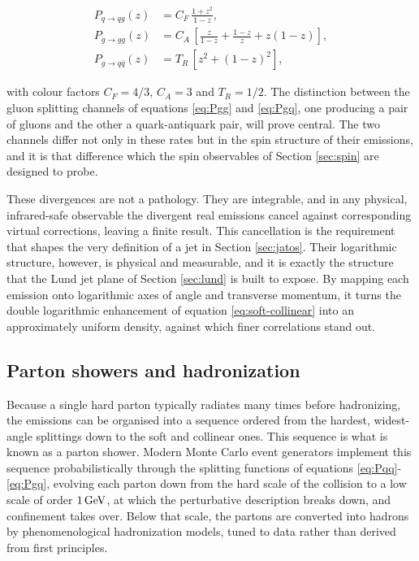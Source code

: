 \begin{align}
  P_{q \to qg}(z) &= C_F\,\frac{1 + z^2}{1 - z}, \label{eq:Pqq}\\[4pt]
  P_{g \to gg}(z) &= C_A\,
    \left[ \frac{z}{1-z} + \frac{1-z}{z} + z(1-z) \right], \label{eq:Pgg}\\[4pt]
  P_{g \to q\bar{q}}(z) &= T_R\,\left[ z^2 + (1-z)^2 \right], \label{eq:Pgq}
\end{align}

with colour factors $C_F = 4/3$, $C_A = 3$ and $T_R = 1/2$. The distinction
between the gluon splitting channels of equations \eqref{eq:Pgg} and \eqref{eq:Pgq},
one producing a pair of gluons and the other a quark-antiquark pair, will
prove central. The two channels differ not only in these rates but in the spin
structure of their emissions, and it is that difference which the spin
observables of Section \ref{sec:spin} are designed to probe.

These divergences are not a pathology. They are integrable, and in any physical,
infrared-safe observable the divergent real emissions cancel against
corresponding virtual corrections, leaving a finite result. This cancellation
is the requirement that shapes the very definition of a jet in Section \ref{sec:jatos}.
Their logarithmic structure, however, is physical and measurable, and it is exactly
the structure that the Lund jet plane of Section \ref{sec:lund} is built to expose.
By mapping each emission onto logarithmic axes of angle and transverse momentum,
it turns the double logarithmic enhancement of equation \eqref{eq:soft-collinear}
into an approximately uniform density, against which finer correlations stand out.

\subsection{Parton showers and hadronization}

Because a single hard parton typically radiates many times before hadronizing,
the emissions can be organised into a sequence ordered from the hardest,
widest-angle splittings down to the soft and collinear ones. This sequence
is what is known as a parton shower. Modern Monte Carlo event generators implement
this sequence probabilistically through the splitting functions of equations 
\eqref{eq:Pqq}-\eqref{eq:Pgq}, evolving each parton down from the hard 
scale of the collision to a low scale of order $1\,\mathrm{GeV}$, at which the perturbative
description breaks down, and confinement takes over. Below that scale, the partons
are converted into hadrons by phenomenological hadronization models, tuned to data
rather than derived from first principles.

